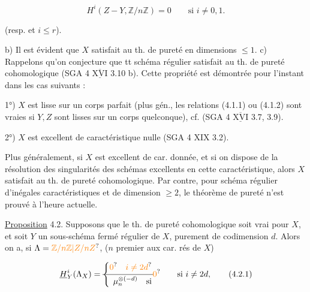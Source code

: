 \[
H^i(Z-Y,\mathbb Z/n\mathbb Z)=0\qquad\text{si }i\ne 0,1.
\]

(resp. et $i\leq r$). 

b) Il est évident  que  $X$ satisfait au th. de pureté  en dimensions $\leq 1$.
c) Rappelons qu'on conjecture que tt schéma régulier satisfait au th. de pureté cohomologique (SGA 4 $\overline{\underline{\mathrm{XVI}}}$ 3.10 b). Cette propriété est démontrée pour l'instant dans les cas suivants :

1°) $X$ est lisse sur un corps parfait (plus gén., les relations (4.1.1) ou (4.1.2) sont vraies si $Y,Z$ sont lisses sur un corps quelconque), cf. (SGA 4 $\overline{\underline{\mathrm{XVI}}}$ 3.7, 3.9).

2°) $X$ est excellent de caractéristique nulle (SGA 4 XIX 3.2). 

 Plus généralement,  si $X$ est excellent de car. donnée,  et si on dispose de la résolution des singularités des schémas excellents en cette caractéristique, alors $X$ satisfait au th. de pureté cohomologique. Par contre,  pour   schéma régulier d'inégales caractéristiques et de dimension $\geq 2$, le théorème de pureté n'est prouvé à l'heure actuelle.


\uline{Proposition} 4.2. Supposons que le th. de pureté  cohomologique soit vrai pour $X$, et soit $Y$ un sous-schéma fermé régulier de $X$, purement de codimension $d$. Alors on a, si $\Lambda=\unsure{\mathbb Z/n\mathbb Z|Z/nZ}$, ($n$ premier aux car. rés de $X$)

\[
\underline H^i_Y(\Lambda_X)=
\deleted{\left\{\begin{aligned}\unsure{0}\quad\unsure{i\ne 2d}\\ \mu_n^{\otimes(-d)}\quad\text{si}\end{aligned}\right.}
\unsure{0}\qquad\text{si }i\ne 2d,
\tag*{(4.2.1)}
\]

